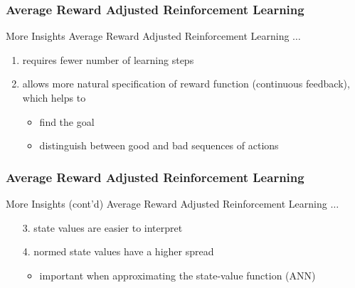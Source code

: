\documentclass[xcolor=table%
,t]{beamer}
\begin{document}
\begin{frame}[t]
  \frametitle{Average Reward Adjusted Reinforcement Learning}

  \begin{block}{More Insights} Average Reward Adjusted Reinforcement Learning \(\ldots\)
    \begin{enumerate}
    \item requires fewer number of learning steps
    \item allows more natural specification of reward function (continuous feedback), which helps
      to
      \begin{itemize}
      \item find the goal
      \item distinguish between good and bad sequences of actions 
      \end{itemize}
    \end{enumerate}
  \end{block}
\end{frame}

\begin{frame}[t]
  \frametitle{Average Reward Adjusted Reinforcement Learning}

  \begin{block}{More Insights (cont'd)}
    Average Reward Adjusted Reinforcement Learning \(\ldots\)
    \begin{enumerate}
    \item[3.] state values are easier to interpret
    \item[4.] normed state values have a higher spread
      \begin{itemize}
      \item important when approximating the state-value function (ANN)
      \end{itemize}
    \end{enumerate}
  \end{block}
\end{frame}
\end{document}
